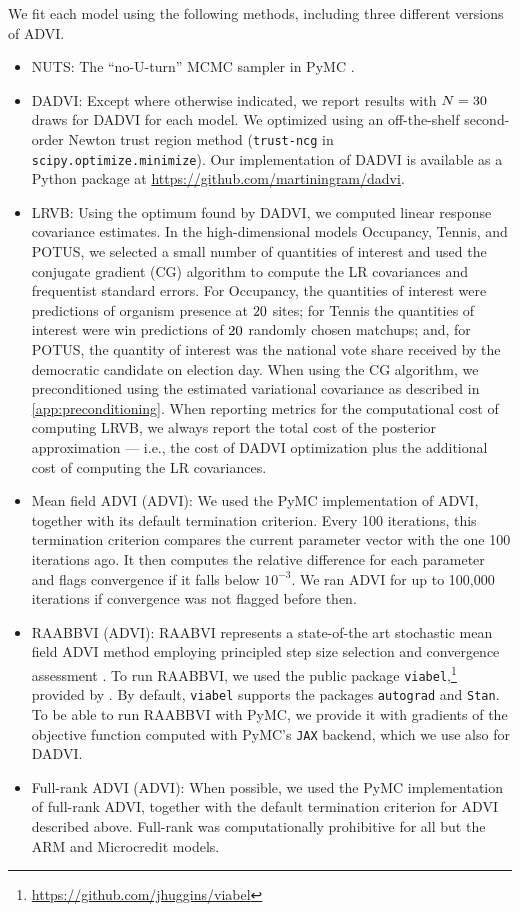We fit each model using the following methods, including three different
versions of ADVI.
%
\begin{itemize}
%
\item NUTS: The ``no-U-turn'' MCMC sampler in PyMC
\citep{salvatier:2016:pymc3}. %
%
\item DADVI:  Except where otherwise indicated, we report results with
$N=30$ draws for DADVI for each model. We optimized using an
off-the-shelf second-order Newton trust region method (\texttt{trust-ncg} in
\texttt{scipy.optimize.minimize}).  Our implementation of DADVI is available as a
Python package at \url{https://github.com/martiningram/dadvi}.
%
\item LRVB: Using the optimum found by DADVI, we computed linear response
covariance estimates.  In the high-dimensional models Occupancy, Tennis, and
POTUS, we selected a small number of quantities of interest and used the
conjugate gradient (CG) algorithm to compute the LR covariances and frequentist
standard errors.  For Occupancy, the quantities of interest were predictions of
organism presence at $20$ sites; for Tennis the quantities of
interest were win predictions of $20$ randomly chosen matchups;
and, for POTUS, the quantity of interest was the national vote share received by
the democratic candidate on election day.  When using the CG algorithm, we
preconditioned using the estimated variational covariance as described in
\cref{app:preconditioning}. When reporting metrics for the computational cost of
computing LRVB, we always report the total cost of the posterior
approximation --- i.e., the cost of DADVI optimization plus the additional cost of
computing the LR covariances.
%
%
\item Mean field ADVI (ADVI): We used the PyMC implementation of
ADVI, together with its default termination criterion. Every 100 iterations,
this termination criterion compares the current parameter vector with the one
100 iterations ago. It then computes the relative difference for each parameter
and flags convergence if it falls below $10^{-3}$. We ran ADVI for up to 100,000
iterations if convergence was not flagged before then.
%
\item RAABBVI (ADVI): RAABVI represents a state-of-the art stochastic
mean field ADVI method employing principled step size selection and convergence
assessment \citep{welandawe:2022:robustbbvi}.  To run RAABBVI, we used the
public package
\texttt{viabel},\footnote{\url{https://github.com/jhuggins/viabel}} provided
by \citet{welandawe:2022:robustbbvi}. By default, \texttt{viabel} supports the
packages \texttt{autograd} and \texttt{Stan}. To be able to run RAABBVI with
PyMC, we provide it with gradients of the objective function computed with
PyMC's \texttt{JAX} backend, which we use also for DADVI.
%
\item Full-rank ADVI (ADVI): When possible, we used the PyMC
implementation of full-rank ADVI, together with the default termination
criterion for ADVI described above.  Full-rank was computationally prohibitive
for all but the ARM and Microcredit models.
%
\end{itemize}
%
%
